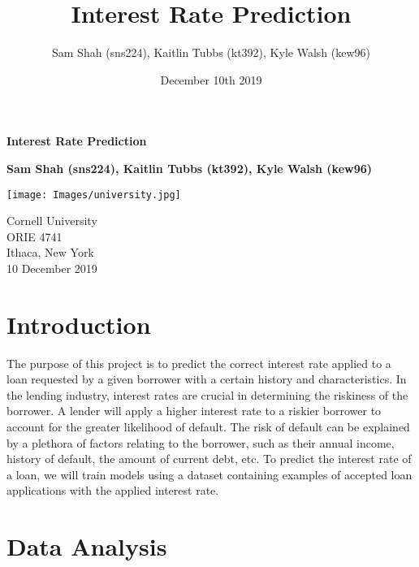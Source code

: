 \documentclass[twocolumn]{article}
\title{Interest Rate Prediction}
\author{Sam Shah (sns224), Kaitlin Tubbs (kt392), Kyle Walsh (kew96)}
\date{December 10th 2019}
\begin{document}
\begin{titlepage}

\begin{center}
       \vspace*{1cm}
       \Large{
       \textbf{Interest Rate Prediction}}
       \Large

       \vspace{1.5cm}
       \textbf{Sam Shah (sns224), Kaitlin Tubbs (kt392), Kyle Walsh (kew96)}
 
 
 
       \vspace{3.5cm}
 
       \texttt{[image: Images/university.jpg]}
       \vspace{1.7cm}
       
       
       Cornell University\\
       ORIE 4741\\
       Ithaca, New York\\
       10 December 2019
 
   \end{center}

\end{titlepage}

\maketitle
\newpage
\section{Introduction}

\par{\hspace{18}The purpose of this project is to predict the correct interest rate applied to a loan requested by a given borrower with a certain history and characteristics. In the lending industry, interest rates are crucial in determining the riskiness of the borrower. A lender will apply a higher interest rate to a riskier borrower to account for the greater likelihood of default. The risk of default can be explained by a plethora of factors relating to the borrower, such as their annual income, history of default, the amount of current debt, etc. To predict the interest rate of a loan, we will train models using a dataset containing examples of accepted loan applications with the applied interest rate. 
}

\section{Data Analysis}
\end{document}
